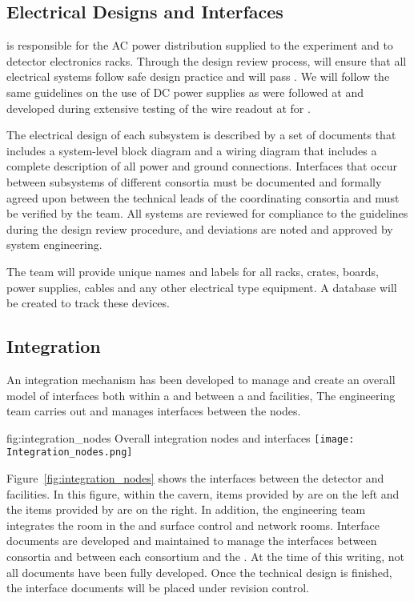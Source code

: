 \subsection{Electrical Designs and Interfaces}
\label{sec:es-tc-elec}

 is responsible for the AC power
distribution supplied to the experiment and to detector electronics
racks.  Through the design review process,  will  ensure 
that all electrical systems  follow safe design practice and
will pass . We will follow the same  guidelines\cite{bib:cernedms2095958} on the use of DC power supplies as
were followed at  and developed during extensive testing of
the  wire readout at  for .  

The electrical design of each subsystem is described by a set of
documents that includes a system-level block diagram and a wiring
diagram that includes a complete description of all power and ground
connections. Interfaces that occur between subsystems of different consortia must be documented and formally agreed upon between the technical leads of the coordinating 
consortia and must be verified by the  team.  All systems are reviewed for compliance to the guidelines during the design review procedure, and deviations  are noted and approved by system engineering. 

The  team will provide unique names and labels
for all racks, crates, boards, power supplies, cables and any other
electrical type equipment.  A database will be created to track these
devices.

\subsection{Integration}
\label{sec:es-tc-integ}

 An integration mechanism has been developed to manage and create an overall model of interfaces both within a  and between a  and facilities,
 The  engineering team carries out  and manages interfaces between the nodes.

\begin{dunefigure}{fig:integration_nodes}
  {Overall integration nodes and interfaces}
  \texttt{[image: Integration\_nodes.png]}
\end{dunefigure}

Figure~\ref{fig:integration_nodes} shows the interfaces between the
detector and facilities. In this figure, within the cavern, items
provided by  are on the left and the items provided by
 are on the right. In addition, the  engineering
team integrates the  room in the  and
surface control and network rooms.  Interface documents are developed and maintained to manage the
interfaces %
between consortia and between %
each consortium and the  . At the time of this writing, not all
documents have been fully developed. Once the technical design is
finished, the interface documents will be placed under revision
control.

